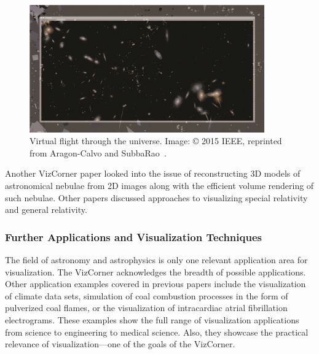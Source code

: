 \documentclass[10pt,journal,compsoc]{IEEEtran}
\begin{document}
{\begin{figure}[H]
    \begin{center}    
        \includegraphics[width=0.9\textwidth]{galaxies.png}
        \caption{Virtual flight through the universe. 
 Image: \copyright{} 2015 IEEE, reprinted from Aragon-Calvo and SubbaRao~\cite{Aragon-Calvo2015}.
  \label{fig:galaxies}}        
    \end{center}
\end{figure}

Another VizCorner paper looked into the issue of reconstructing 3D models of astronomical nebulae from 2D images along with the efficient volume rendering of such nebulae. Other papers discussed approaches to visualizing special relativity and general relativity. 


\subsubsection{Further Applications and Visualization Techniques}

The field of astronomy and astrophysics is only one relevant application area for visualization. The VizCorner acknowledges the breadth of possible applications. Other application examples covered in previous papers include the visualization of climate data sets, simulation of coal combustion processes in the form of pulverized coal flames, or the visualization of intracardiac atrial fibrillation electrograms. These examples show the full range of visualization applications from science to engineering to medical science. Also, they showcase the practical relevance of visualization---one of the goals of the VizCorner. 

}
\end{document}
